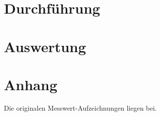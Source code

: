 \documentclass[numbers=noenddot,12pt,a4paper]{scrartcl}
\begin{document}
\section{Durchführung}
\section{Auswertung}
\section{Anhang}
Die originalen Messwert-Aufzeichnungen liegen bei.
\end{document}
